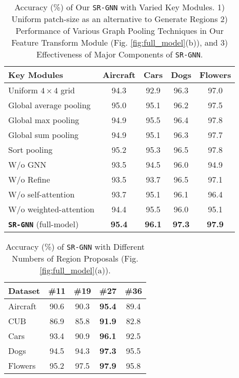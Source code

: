 \documentclass[journal]{IEEEtran}
\begin{document}
\begin{table} \begin{center}
 \caption{Accuracy (\%) of Our \texttt{SR-GNN} with Varied Key Modules. 1) Uniform patch-size as an alternative to  Generate Regions 2) Performance of Various Graph Pooling Techniques in Our Feature Transform Module (Fig. \ref{fig:full_model}(b)), and 3) Effectiveness of Major Components of \texttt{SR-GNN}. }
 \label{table:Abln1}
\begin{tabular}{|l| c c c c |}
 \hline
   Key Modules  & Aircraft & Cars &  Dogs & Flowers   \\
   \hline  
 Uniform $4\times4$ grid & 94.3 & 92.9 & 96.3 & 97.0  \\
 \hline
Global average pooling & 95.0 & 95.1 & 96.2 &97.5 \\
Global max pooling &94.9 &95.5 &96.4 & 97.8 \\
Global sum pooling \cite{xu2018powerful} & 94.9 & 95.1 & 96.3 & 97.7  \\
Sort pooling \cite{zhang2018end} & 95.2 & 95.3 & 96.5 & 97.8  \\
 \hline
 W/o  GNN  & 93.5 & 94.5 & 96.0 & 94.9   \\
 W/o Refine & 93.5 & 93.7& 96.5 & 97.1\\
 W/o self-attention & 93.7 & 95.1 & 96.1 & 96.4  \\
  W/o weighted-attention & 94.4 & 95.5 & 96.0 & 95.1   \\
\hline
\textbf{\texttt{SR-GNN}} (full-model) & \textbf{95.4}  &\textbf{96.1} &\textbf{97.3} & \textbf{97.9} \\
\hline
\end{tabular}
 \end{center}
 \vspace{-0.3cm}
\end{table}
\begin{table}
\begin{center}
 \caption{Accuracy (\%) of \texttt{SR-GNN} with Different Numbers of Region Proposals (Fig. \ref{fig:full_model}(a)). }
 \label{table:RoI}

\begin{tabular}{|l| c c c c|}
 \hline
    Dataset & \#11 & \#19 & \#27 & \#36 \\
    \hline 
  Aircraft & 90.6 & 90.3 & \textbf{95.4} & 89.4  \\
  CUB &  86.9 & 85.8 & \textbf{91.9} & 82.8\\ 
Cars & 93.4 & 90.9 & \textbf{96.1} & 92.5  \\
  Dogs &  94.5 & 94.3 & \textbf{97.3} & 95.5\\ 
  Flowers & 95.2 & 97.5 & \textbf{97.9} & 95.8\\
\hline
\end{tabular}
 \end{center}
 \vspace{-0.5 cm}
\end{table}
\end{document}
